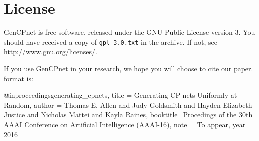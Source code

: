 \documentclass{article}
\begin{document}
\section{License}

GenCPnet is free software,
released under the GNU Public License version 3.
You should have received a copy of \texttt{gpl-3.0.txt} in the
archive.  If not, see \url{http://www.gnu.org/licenses/}.

If you use GenCPnet in your research, we hope you will choose to
cite our paper.  \BibTeX{} format is:
\begin{verbnobox}[\small]
@inproceedings{generating_cpnets,
  title  = {Generating {CP}-nets Uniformly at Random},
  author = {Thomas E. Allen and 
    Judy Goldsmith and Hayden Elizabeth Justice and Nicholas Mattei and Kayla Raines},
  booktitle={Procedings of the 30th AAAI Conference on Artificial Intelligence (AAAI-16)},
  note = {To appear},
  year = {2016}
}
\end{verbnobox}



\end{document}

